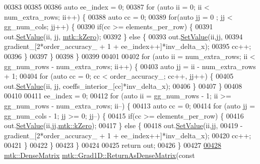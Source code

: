 \begin{DoxyCode}
{{00383 
00385 
00386   \textcolor{keyword}{auto} ee\_index = 0;
00387   \textcolor{keywordflow}{for} (\textcolor{keyword}{auto} ii = 0; ii < num\_extra\_rows; ii++) \{
00388     \textcolor{keyword}{auto} cc = 0;
00389     \textcolor{keywordflow}{for}(\textcolor{keyword}{auto} jj = 0 ; jj < gg\_num\_cols; jj++) \{
00390       \textcolor{keywordflow}{if}(cc >= elements\_per\_row) \{
00391         out.\hyperlink{classmtk_1_1DenseMatrix_ae0f873a6d3a734da467cafb817da64ae}{SetValue}(ii, jj, \hyperlink{group__c01-roots_ga59a451a5fae30d59649bcda274fea271}{mtk::kZero});
00392       \} \textcolor{keywordflow}{else} \{
00393         out.\hyperlink{classmtk_1_1DenseMatrix_ae0f873a6d3a734da467cafb817da64ae}{SetValue}(ii,jj,
00394                      gradient\_[2*order\_accuracy\_ + 1 + ee\_index++]*inv\_delta\_x);
00395         cc++;
00396       \}
00397     \}
00398   \}
00399 
00401 
00402   \textcolor{keywordflow}{for} (\textcolor{keyword}{auto} ii = num\_extra\_rows; ii < gg\_num\_rows - num\_extra\_rows; ii++) \{
00403     \textcolor{keyword}{auto} jj = ii - num\_extra\_rows + 1;
00404     \textcolor{keywordflow}{for} (\textcolor{keyword}{auto} cc = 0; cc < order\_accuracy\_; cc++, jj++) \{
00405       out.\hyperlink{classmtk_1_1DenseMatrix_ae0f873a6d3a734da467cafb817da64ae}{SetValue}(ii, jj, coeffs\_interior\_[cc]*inv\_delta\_x);
00406     \}
00407   \}
00408 
00410 
00411   ee\_index = 0;
00412   \textcolor{keywordflow}{for} (\textcolor{keyword}{auto} ii = gg\_num\_rows - 1; ii >= gg\_num\_rows - num\_extra\_rows; ii--) \{
00413     \textcolor{keyword}{auto} cc = 0;
00414     \textcolor{keywordflow}{for} (\textcolor{keyword}{auto} jj = gg\_num\_cols - 1; jj >= 0; jj--) \{
00415       \textcolor{keywordflow}{if}(cc >= elements\_per\_row) \{
00416         out.\hyperlink{classmtk_1_1DenseMatrix_ae0f873a6d3a734da467cafb817da64ae}{SetValue}(ii,jj,\hyperlink{group__c01-roots_ga59a451a5fae30d59649bcda274fea271}{mtk::kZero});
00417       \} \textcolor{keywordflow}{else} \{
00418         out.\hyperlink{classmtk_1_1DenseMatrix_ae0f873a6d3a734da467cafb817da64ae}{SetValue}(ii,jj,
00419                      -gradient\_[2*order\_accuracy\_ + 1 + ee\_index++]*inv\_delta\_x);
00420         cc++;
00421       \}
00422      \}
00423   \}
00424 
00425   \textcolor{keywordflow}{return} out;
00426 \}
00427 
\hypertarget{mtk__grad__1d_8cc_source_l00428}{}\hyperlink{classmtk_1_1Grad1D_a75781c4455569a7934d4e0dff7e06064}{00428} \hyperlink{classmtk_1_1DenseMatrix}{mtk::DenseMatrix} \hyperlink{classmtk_1_1Grad1D_a4218516bfb43f683559322ea97058c78}{mtk::Grad1D::ReturnAsDenseMatrix}(\textcolor{keyword}{const} 
}}
\end{DoxyCode}
